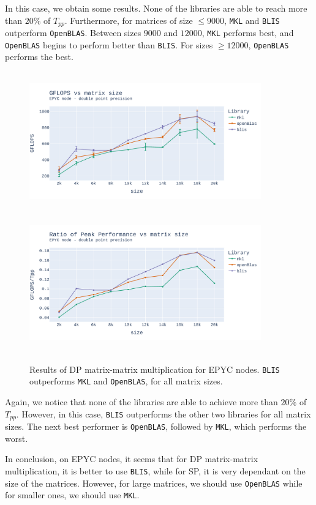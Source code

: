 \documentclass{report}
\begin{document}
In this case, we obtain some results. None of the libraries are able to reach 
more than $20\%$ of $T_{pp}$. Furthermore, for matrices of size $\leq 9000$, 
\texttt{MKL} and \texttt{BLIS} outperform \texttt{OpenBLAS}. Between sizes 
$9000$ and $12000$, \texttt{MKL} performs best, and \texttt{OpenBLAS} begins to 
perform better than \texttt{BLIS}. For sizes $\geq 12000$, \texttt{OpenBLAS} 
performs the best.

\begin{figure}[h!p]
\hspace*{-2.5cm}
\includegraphics[width=10cm, height=6cm]{./images/fixed_cores_epyc_double_gflops.pdf}
\includegraphics[width=10cm, height=6cm]{./images/fixed_cores_epyc_double_gflops_ratio.pdf}
\caption{\label{fig:fixed_cores_epyc_double} Results of DP matrix-matrix multiplication 
for EPYC nodes. \texttt{BLIS} outperforms \texttt{MKL} and \texttt{OpenBLAS}, 
for all matrix sizes.}

\end{figure}
Again, we notice that none of the libraries are able to achieve more than $20\%$ 
of $T_{pp}$. However, in this case, \texttt{BLIS} outperforms the other two libraries 
for all matrix sizes. The next best performer is \texttt{OpenBLAS}, followed by 
\texttt{MKL}, which performs the worst.

In conclusion, on EPYC nodes, it seems that for DP matrix-matrix multiplication, 
it is better to use \texttt{BLIS}, while for SP, it is very dependant on the 
size of the matrices. However, for large matrices, we should use \texttt{OpenBLAS}
while for smaller ones, we should use \texttt{MKL}. 
\end{document}
